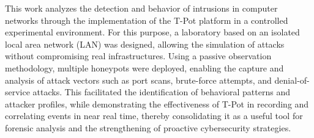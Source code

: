This work analyzes the detection and behavior of intrusions in computer networks through the implementation of the T-Pot platform in a controlled experimental environment. For this purpose, a laboratory based on an isolated local area network (LAN) was designed, allowing the simulation of attacks without compromising real infrastructures. Using a passive observation methodology, multiple honeypots were deployed, enabling the capture and analysis of attack vectors such as port scans, brute-force attempts, and denial-of-service attacks. This facilitated the identification of behavioral patterns and attacker profiles, while demonstrating the effectiveness of T-Pot in recording and correlating events in near real time, thereby consolidating it as a useful tool for forensic analysis and the strengthening of proactive cybersecurity strategies.